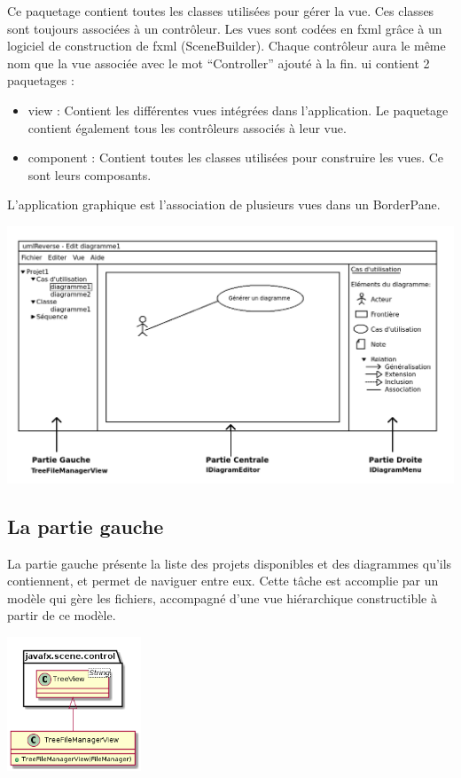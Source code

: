 \documentclass[a4paper,10pt]{article}
\begin{document}
    Ce paquetage contient toutes les classes utilisées pour gérer la vue. Ces classes sont toujours associées à un contrôleur.
    Les vues sont codées en fxml grâce à un logiciel de construction de fxml (SceneBuilder). Chaque contrôleur aura le même nom
    que la vue associée avec le mot ``Controller'' ajouté à la fin.
    ui contient 2 paquetages :
    \begin{itemize}
    \item view : Contient les différentes vues intégrées dans l'application. Le paquetage contient également tous les contrôleurs associés à leur vue.
    \item component : Contient toutes les classes utilisées pour construire les vues. Ce sont leurs composants.
    \end{itemize}
    L'application graphique est l'association de plusieurs vues dans un BorderPane.
    
    \begin{center}
	\includegraphics[width=\textwidth]{Image/maquette.png}
    \end{center}

  \subsection{La partie gauche}
    La partie gauche présente la liste des projets disponibles et des diagrammes qu’ils contiennent, et permet de naviguer entre eux. 
    Cette tâche est accomplie par un modèle qui gère les fichiers, accompagné d’une vue hiérarchique constructible à partir de ce modèle.
    
    \begin{center}
	\includegraphics[width=4cm]{Image/partieGaucheVue.png}
    \end{center}
\end{document}
